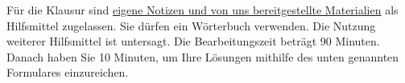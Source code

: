 {	Für die Klausur sind \underline{eigene Notizen und von uns bereitgestellte Materialien} als Hilfsmittel zugelassen. Sie dürfen ein Wörterbuch verwenden. Die Nutzung weiterer Hilfsmittel ist untersagt. Die Bearbeitungszeit beträgt 90 Minuten. Danach haben Sie 10 Minuten, um Ihre Lösungen mithilfe des unten genannten Formulares einzureichen.
    \hspace{0pt}

    \vfill
}
